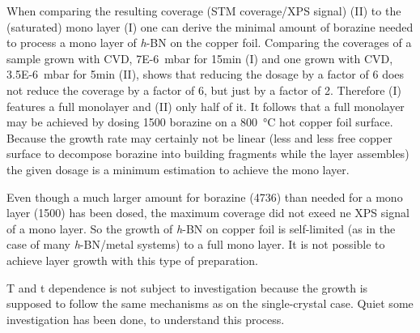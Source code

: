 When comparing the resulting coverage (STM coverage/XPS signal) (II) to the (saturated) mono layer (I) one can derive the minimal amount of borazine needed to process a mono layer of \textit{h}-BN on the copper foil. Comparing the coverages of a sample grown with CVD, \SI{7E-6}{\milli \bar} for 15min (I) and one grown with CVD, \SI{3.5E-6}{\milli \bar} for 5min (II), shows that reducing the dosage by a factor of 6 does not reduce the coverage by a factor of 6, but just by a factor of 2. Therefore (I) features a full monolayer and (II) only half of it. It follows that a full monolayer may be achieved by dosing \SI{1500}{\langmuir} borazine on a \SI{800}{\degreeCelsius} hot copper foil surface. 
Because the growth rate may certainly not be linear (less and less free copper surface to decompose borazine into building fragments while the layer assembles) the given dosage is a minimum estimation to achieve the mono layer.

Even though a much larger amount for borazine (\SI{4736}{\langmuir}) than needed for a mono layer (\SI{1500}{\langmuir}) has been dosed, the maximum coverage did not exeed ne XPS signal of a mono layer. So the growth of \textit{h}-BN on copper foil is self-limited (as in the case of many \textit{h}-BN/metal systems) to a full mono layer. It is not possible to achieve layer growth with this type of preparation.

T and t dependence is not subject to investigation because the growth is supposed to follow the same mechanisms as on the single-crystal case. Quiet some investigation has been done, \cite{orlando_epitaxial_2012,preobrajenski_monolayer_2007-1} to understand this process.


